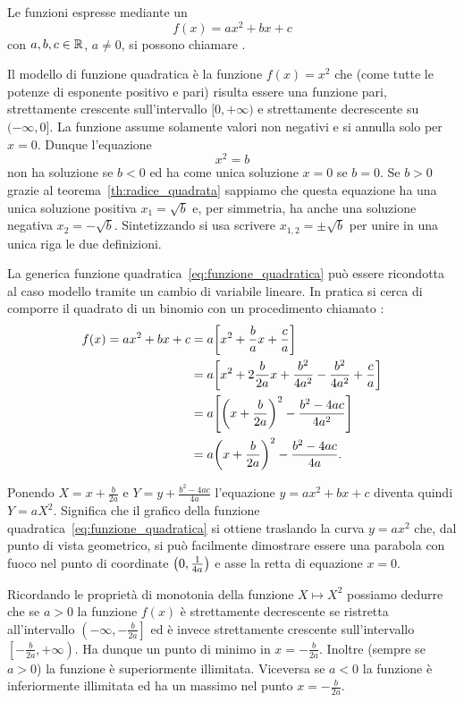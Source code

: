 Le funzioni espresse mediante un 
\begin{equation}\label{eq:funzione_quadratica}
  f(x) = ax^2 + bx +c
\end{equation}
con $a,b,c\in \mathbb R$, $a\neq 0$, si possono chiamare
.

Il modello di funzione quadratica è la funzione
$f(x) = x^2$ che (come tutte le potenze di esponente positivo e pari)
risulta essere una funzione pari, strettamente crescente
sull'intervallo $[0,+\infty)$ e strettamente decrescente
su $(-\infty,0]$. La funzione assume solamente valori non negativi
e si annulla solo per $x=0$.
Dunque l'equazione
\[
  x^2 = b
\]
non ha soluzione se $b<0$ ed ha come unica soluzione $x=0$ se $b=0$.
Se $b>0$ grazie al teorema~\ref{th:radice_quadrata} sappiamo che
questa equazione ha una unica soluzione positiva $x_1 = \sqrt{b}$
e, per simmetria, ha anche una soluzione negativa $x_2 = -\sqrt{b}$.
Sintetizzando si usa scrivere $x_{1,2} = \pm \sqrt{b}$
per unire in una unica riga le due definizioni.

La generica funzione quadratica~\eqref{eq:funzione_quadratica}
può essere ricondotta al caso modello tramite un cambio
di variabile lineare. In pratica si cerca di comporre il quadrato
di un binomio con un procedimento chiamato
:
\begin{equation}\label{eq:24589}
\begin{aligned}
f(x) = ax^2+bx+c
  &= a {\left[ x^2+\frac b a x + \frac c a \right]}\\
  &= a {\left[ x^2+2 \frac{b}{2a} x + \frac{b^2}{4a^2} - \frac{b^2}{4a^2} + \frac c a \right]}\\
  &= a {\left[ {\left( x+\frac{b}{2a} \right)}^2 - \frac{b^2-4ac}{4a^2} \right]} \\
  &= a{\left( x+\frac b{2a} \right)}^2  - \frac{b^2-4ac}{4a}.
\end{aligned}
\end{equation}

Ponendo $X=x+\frac b{2a}$ e $Y=y+\frac{b^2-4ac}{4a}$
l'equazione $y=ax^2+bx+c$ diventa quindi $Y=aX^2$. Significa
che il grafico della funzione quadratica~\eqref{eq:funzione_quadratica}
si ottiene traslando la curva $y=a x^2$ che, dal punto di vista
geometrico, si può facilmente
dimostrare essere una parabola con fuoco
nel punto di coordinate ${\left( 0,\frac 1 {4a} \right)}$
e asse la retta di equazione $x=0$.

Ricordando le proprietà di monotonia della funzione $X\mapsto X^2$
possiamo dedurre che se $a>0$ la funzione $f(x)$ è strettamente
decrescente se ristretta all'intervallo $\left(-\infty,-\frac b {2a}\right]$ ed è invece strettamente crescente sull'intervallo $\left[-\frac b{2a},+\infty\right)$. Ha dunque un punto di minimo in $x=-\frac{b}{2a}$.
Inoltre (sempre se $a>0$) la funzione è superiormente illimitata.
Viceversa se $a<0$ la funzione è inferiormente illimitata ed ha un massimo nel punto $x=-\frac{b}{2a}$.

